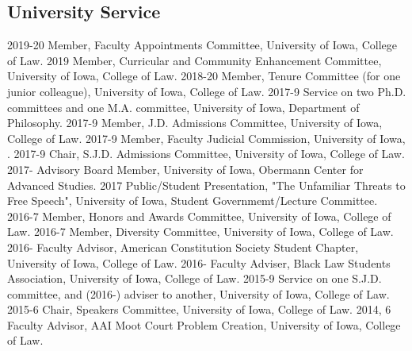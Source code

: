 \documentclass[letterpaper]{moderncv}
\begin{document}
\subsection{University Service}
\cvitem
{2019-20}
{Member, Faculty Appointments Committee, University of Iowa, College of Law.}
\vspace{1mm}
\cvitem
{2019}
{Member, Curricular and Community Enhancement Committee, University of Iowa, College of Law.}
\vspace{1mm}
\cvitem
{2018-20}
{Member, Tenure Committee (for one junior colleague), University of Iowa, College of Law.}
\vspace{1mm}
\cvitem
{2017-9}
{Service on two Ph.D. committees and one M.A. committee, University of Iowa, Department of Philosophy.}
\vspace{1mm}
\cvitem
{2017-9}
{Member, J.D. Admissions Committee, University of Iowa, College of Law.}
\vspace{1mm}
\cvitem
{2017-9}
{Member, Faculty Judicial Commission, University of Iowa, .}
\vspace{1mm}
\cvitem
{2017-9}
{Chair, S.J.D. Admissions Committee, University of Iowa, College of Law.}
\vspace{1mm}
\cvitem
{2017-}
{Advisory Board Member, University of Iowa, Obermann Center for Advanced Studies.}
\vspace{1mm}
\cvitem
{2017}
{Public/Student Presentation, "The Unfamiliar Threats to Free Speech", University of Iowa, Student Governmemt/Lecture Committee.}
\vspace{1mm}
\cvitem
{2016-7}
{Member, Honors and Awards Committee, University of Iowa, College of Law.}
\vspace{1mm}
\cvitem
{2016-7}
{Member, Diversity Committee, University of Iowa, College of Law.}
\vspace{1mm}
\cvitem
{2016-}
{Faculty Advisor, American Constitution Society Student Chapter, University of Iowa, College of Law.}
\vspace{1mm}
\cvitem
{2016-}
{Faculty Adviser, Black Law Students Association, University of Iowa, College of Law.}
\vspace{1mm}
\cvitem
{2015-9}
{Service on one S.J.D. committee, and (2016-) adviser to another, University of Iowa, College of Law.}
\vspace{1mm}
\cvitem
{2015-6}
{Chair, Speakers Committee, University of Iowa, College of Law.}
\vspace{1mm}
\cvitem
{2014, 6}
{Faculty Advisor, AAI Moot Court Problem Creation, University of Iowa, College of Law.}
\end{document}
